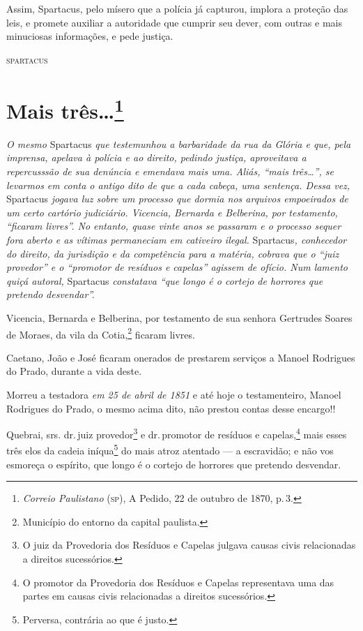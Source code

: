 Assim, Spartacus, pelo mísero que a polícia já capturou, implora a
proteção das leis, e promete auxiliar a autoridade que cumprir seu
dever, com outras e mais minuciosas informações, e pede justiça.

\begin{flushright}
\textsc{spartacus}
\end{flushright}

\chapter{Mais três\ldots{}\footnote{\emph{Correio Paulistano} (\textsc{sp}), A Pedido, 22 de outubro de 1870,
  p.\,3.}} %

\begin{didascalia}
\emph{O mesmo} Spartacus \emph{que testemunhou a barbaridade da rua da
Glória e que, pela imprensa, apelava à polícia e ao direito, pedindo
justiça, aproveitava a repercusssão de sua denúncia e emendava mais uma.
Aliás, ``mais três\ldots{}'', se levarmos em conta o antigo dito de que a cada
cabeça, uma sentença. Dessa vez,} Spartacus \emph{jogava luz sobre um
processo que dormia nos arquivos empoeirados de um certo cartório
judiciário. Vicencia, Bernarda e Belberina, por testamento, ``ficaram
livres''. No entanto, quase vinte anos se passaram e o processo sequer
fora aberto e as vítimas permaneciam em cativeiro ilegal.}
Spartacus\emph{, conhecedor do direito, da jurisdição e da competência
para a matéria, cobrava que o ``juiz provedor'' e o ``promotor de resíduos
e capelas'' agissem de ofício. Num lamento quiçá autoral,} Spartacus
\emph{constatava ``que longo é o cortejo de horrores que pretendo
desvendar''.}
\end{didascalia}


Vicencia, Bernarda e Belberina, por testamento de sua senhora Gertrudes
Soares de Moraes, da vila da Cotia,\footnote{ Município do entorno da
  capital paulista.} ficaram livres.

Caetano, João e José ficaram onerados de prestarem serviços a Manoel
Rodrigues do Prado, durante a vida deste.

Morreu a testadora \emph{em 25 de abril de 1851} e até hoje o
testamenteiro, Manoel Rodrigues do Prado, o mesmo acima dito, não
prestou contas desse encargo!!

Quebrai, srs. dr.\,juiz provedor\footnote{ O juiz da Provedoria dos
  Resíduos e Capelas julgava causas civis relacionadas a direitos
  sucessórios.} e dr.\,promotor de resíduos e capelas,\footnote{ O
  promotor da Provedoria dos Resíduos e Capelas representava uma das
  partes em causas civis relacionadas a direitos sucessórios.} mais
esses três elos da cadeia iníqua\footnote{ Perversa, contrária ao que é
  justo.} do mais atroz atentado --- a escravidão; e não vos esmoreça o
espírito, que longo é o cortejo de horrores que pretendo desvendar.

